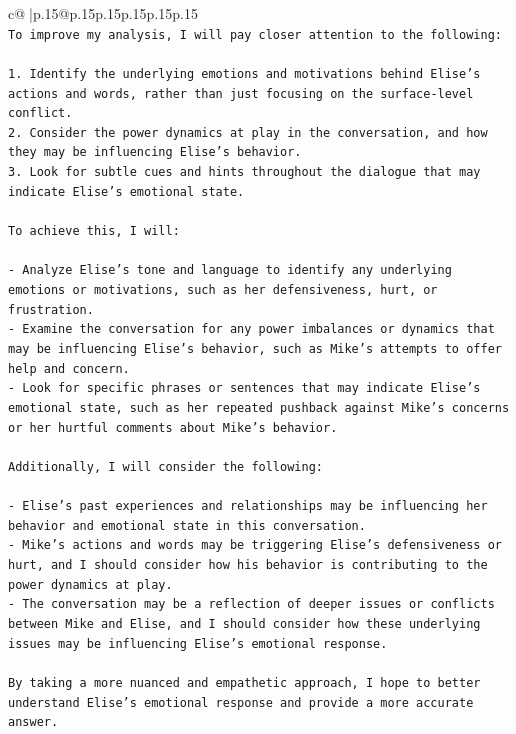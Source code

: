 \documentclass{article}
\begin{document}
{\begin{supertabular}{c@{$\;$}|p{.15\linewidth}@{}p{.15\linewidth}p{.15\linewidth}p{.15\linewidth}p{.15\linewidth}p{.15\linewidth}}
{{{\\ 
\texttt{To improve my analysis, I will pay closer attention to the following:} \\
\\ 
\texttt{1. Identify the underlying emotions and motivations behind Elise's actions and words, rather than just focusing on the surface{-}level conflict.} \\
\texttt{2. Consider the power dynamics at play in the conversation, and how they may be influencing Elise's behavior.} \\
\texttt{3. Look for subtle cues and hints throughout the dialogue that may indicate Elise's emotional state.} \\
\\ 
\texttt{To achieve this, I will:} \\
\\ 
\texttt{{-} Analyze Elise's tone and language to identify any underlying emotions or motivations, such as her defensiveness, hurt, or frustration.} \\
\texttt{{-} Examine the conversation for any power imbalances or dynamics that may be influencing Elise's behavior, such as Mike's attempts to offer help and concern.} \\
\texttt{{-} Look for specific phrases or sentences that may indicate Elise's emotional state, such as her repeated pushback against Mike's concerns or her hurtful comments about Mike's behavior.} \\
\\ 
\texttt{Additionally, I will consider the following:} \\
\\ 
\texttt{{-} Elise's past experiences and relationships may be influencing her behavior and emotional state in this conversation.} \\
\texttt{{-} Mike's actions and words may be triggering Elise's defensiveness or hurt, and I should consider how his behavior is contributing to the power dynamics at play.} \\
\texttt{{-} The conversation may be a reflection of deeper issues or conflicts between Mike and Elise, and I should consider how these underlying issues may be influencing Elise's emotional response.} \\
\\ 
\texttt{By taking a more nuanced and empathetic approach, I hope to better understand Elise's emotional response and provide a more accurate answer.} \\
\\ 
}}}
\end{supertabular}}
\end{document}
